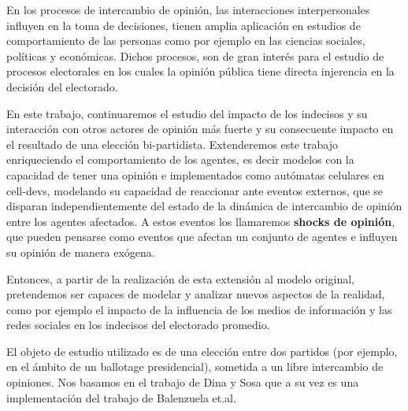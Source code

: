 En los procesos de intercambio de opinión, las interacciones interpersonales influyen en la toma de decisiones, tienen amplia aplicación en estudios de comportamiento de las personas como por ejemplo en las ciencias sociales, políticas y económicas. Dichos procesos, son de gran interés para el estudio de procesos electorales en los cuales la opinión pública tiene directa injerencia en la decisión del electorado.

En este trabajo, continuaremos el estudio del impacto de los indecisos y su
interacción con otros actores de opinión más fuerte y su consecuente impacto en
el resultado de una elección bi-partidista. Extenderemos este trabajo
enriqueciendo el comportamiento de los agentes, es decir modelos con la capacidad de tener una opinión e implementados como autómatas celulares en cell-devs, modelando su capacidad de reaccionar ante eventos externos,
que se disparan independientemente del estado de la dinámica de intercambio de
opinión entre los agentes afectados. A estos eventos los
llamaremos \textbf{shocks de opinión}, que pueden pensarse como eventos que
afectan un conjunto de agentes e influyen su opinión de manera exógena.

Entonces, a partir de la realización de esta extensión al modelo original, pretendemos ser capaces de modelar y analizar nuevos aspectos de la realidad, como por ejemplo el impacto de la influencia de los medios de información y las redes sociales en los indecisos del electorado promedio.

El objeto de estudio utilizado  es de una elección entre dos partidos (por ejemplo, en el ámbito de un ballotage presidencial), sometida a un libre intercambio de opiniones. Nos basamos en el trabajo de Dina y Sosa\cite{dina2015}  que a su vez es una implementación del trabajo de Balenzuela et.al\cite{balenzuela}.
